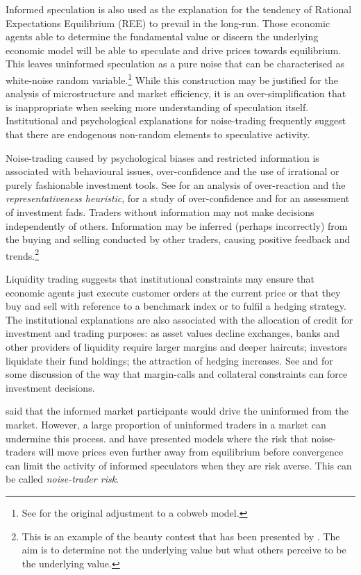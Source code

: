 \documentclass[preprint,12pt,authoryear]{elsarticle}
\begin{document}
Informed speculation is also used as the explanation for the tendency of Rational Expectations Equilibrium (REE) to prevail in the long-run.  Those economic agents able to determine the fundamental value or discern the underlying economic model will be able to speculate and drive prices towards equilibrium.   This leaves uninformed speculation as a pure noise that can be characterised as white-noise random variable.\footnote{See \citet{muth1961Rational} for the original adjustment to a cobweb model.} While this construction may be justified for the analysis of microstructure and market efficiency, it is an over-simplification that is inappropriate when seeking more understanding of speculation itself.  Institutional and psychological explanations for noise-trading frequently suggest that there are endogenous non-random elements to speculative activity.

Noise-trading caused by psychological biases and restricted information is associated with behavioural issues, over-confidence and the use of irrational or purely fashionable investment tools. See \citet{DeBondtOver} for an analysis of over-reaction and the \emph{representativeness heuristic}, \citet{OdeanOC} for a study of over-confidence and  \citet{ShillerFashion} for an assessment of investment fads.  Traders without information may not make decisions independently of others. Information may be inferred (perhaps incorrectly) from the buying and selling conducted by other traders, causing positive feedback and trends.\footnote{This is an example of the beauty contest that has been presented by \citet[p.101]{Keynes1936}. The aim is to determine not the underlying value but what others perceive to be the underlying value.} 

Liquidity trading suggests that institutional constraints may ensure that economic agents just execute customer orders at the current price or that they buy and sell with reference to a benchmark index or to fulfil a hedging strategy. The institutional explanations are also associated with the allocation of credit for investment and trading purposes:  as asset values decline exchanges, banks and other providers of liquidity require larger margins and deeper haircuts; investors liquidate their fund holdings; the attraction of hedging increases.  See \citet{BrunnermeierLiquidity} and \citet{Gorton} for some discussion of the way that margin-calls and collateral constraints can force investment decisions.  

\citet{FriedmanPositive} said that the informed market participants would drive the uninformed from the market.  However, a large proportion of uninformed traders in a market can undermine this process.  \citet{Delong1990noise} and \citet{shleifer1997limits} have presented models where the risk that noise-traders will move prices even further away from equilibrium before convergence can limit the activity of informed speculators when they are risk averse. This can be called \emph{noise-trader risk}.
\end{document}
